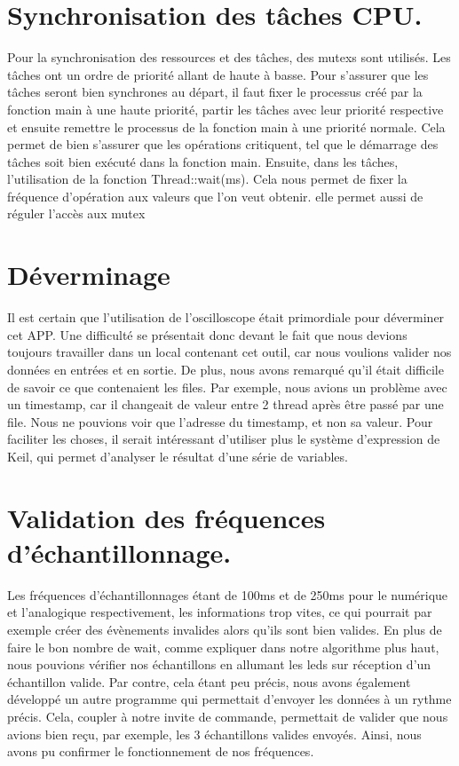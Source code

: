 \documentclass[12pt]{article}
\begin{document}
\section{Synchronisation des tâches CPU.}
Pour la synchronisation des ressources et des tâches, des mutexs sont utilisés. Les tâches ont un ordre de priorité allant de haute à basse. Pour s'assurer que les tâches seront bien synchrones au départ, il faut fixer le processus créé par la fonction main à une haute priorité, partir les tâches avec leur priorité respective et ensuite remettre le processus de la fonction main à une priorité normale. Cela permet de bien s'assurer que les opérations critiquent, tel que le démarrage des tâches soit bien exécuté dans la fonction main. Ensuite, dans les tâches, l'utilisation de la fonction Thread::wait(ms). Cela nous permet de fixer la fréquence d'opération aux valeurs que l'on veut obtenir. elle permet aussi de réguler l'accès aux mutex  \section{Déverminage}
Il est certain que l'utilisation de l'oscilloscope était primordiale pour déverminer cet APP. Une difficulté se présentait donc devant le fait que nous devions toujours travailler dans un local contenant cet outil, car nous voulions valider nos données en entrées et en sortie. De plus, nous avons remarqué qu'il était difficile de savoir ce que contenaient les files. Par exemple, nous avions un problème avec un timestamp, car il changeait de valeur entre 2 thread après être passé par une file. Nous ne pouvions voir que l'adresse du timestamp, et non sa valeur. Pour faciliter les choses, il serait intéressant d'utiliser plus le système d'expression de Keil, qui permet d'analyser le résultat d'une série de variables. 
\section{Validation des fréquences d'échantillonnage.}
Les fréquences d'échantillonnages étant de 100ms et de 250ms pour le numérique et l'analogique respectivement, les informations trop vites, ce qui pourrait par exemple créer des évènements invalides alors qu'ils sont bien valides. En plus de faire le bon nombre de wait, comme expliquer dans notre algorithme plus haut, nous pouvions vérifier nos échantillons en allumant les leds sur réception d'un échantillon valide. Par contre, cela étant peu précis, nous avons également développé un autre programme qui permettait d'envoyer les données à un rythme précis. Cela, coupler à notre invite de commande, permettait de valider que nous avions bien reçu, par exemple, les 3 échantillons valides envoyés. Ainsi, nous avons pu confirmer le fonctionnement de nos fréquences.
\end{document}
